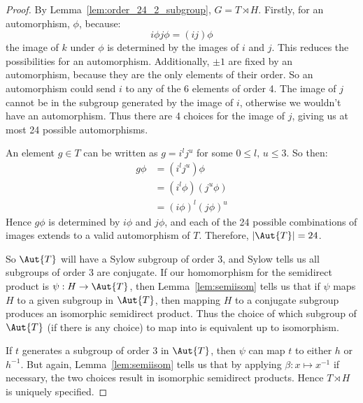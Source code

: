 \begin{proof}
    By Lemma~\ref{lem:order_24_2_subgroup}, \(G = T \rtimes H\).
    Firstly, for an automorphism, \(\phi\), because:
    \[i\phi j\phi = (ij)\phi\]
    the image of \(k\) under \(\phi\) is determined by the images of \(i\) and \(j\).
    This reduces the possibilities for an automorphism.
    Additionally, \(\pm 1\) are fixed by an automorphism, because they are the only elements of their order.
    So an automorphism could send \(i\) to any of the 6 elements of order 4.
    The image of \(j\) cannot be in the subgroup generated by the image of \(i\), otherwise we wouldn't have an
    automorphism.
    Thus there are 4 choices for the image of \(j\), giving us at most 24 possible automorphisms.

    An element \(g \in T\) can be written as \(g = i^l j^u\) for some \(0 \leqslant l,\, u \leqslant 3\).
    So then:
    \begin{align*}
        g\phi &= (i^l j^u) \phi \\
        &= (i^l \phi)(j^u \phi) \\
        &= {(i\phi)}^l {(j\phi)}^u
    \end{align*}
    Hence \(g\phi\) is determined by \(i\phi\) and \(j\phi\), and each of the 24 possible combinations of images extends
    to a valid automorphism of \(T\).
    Therefore, \(|\Aut{T}| = 24\).

    So \(\Aut{T}\) will have a Sylow subgroup of order 3, and Sylow tells us all subgroups of order 3 are conjugate.
    If our homomorphism for the semidirect product is \(\psi:H \to \Aut{T}\), then Lemma~\ref{lem:semiisom} tells us
    that if \(\psi\) maps \(H\) to a given subgroup in \(\Aut{T}\), then mapping \(H\) to a conjugate subgroup produces
    an isomorphic semidirect product.
    Thus the choice of which subgroup of \(\Aut{T}\) (if there is any choice) to map into is equivalent up to
    isomorphism.

    If \(t\) generates a subgroup of order 3 in \(\Aut{T}\), then \(\psi\) can map \(t\) to either \(h\) or \(h^{-1}\).
    But again, Lemma~\ref{lem:semiisom} tells us that by applying \(\beta:x \mapsto x^{-1}\) if necessary, the two
    choices result in isomorphic semidirect products.
    Hence \(T \rtimes H\) is uniquely specified.


\end{proof}
